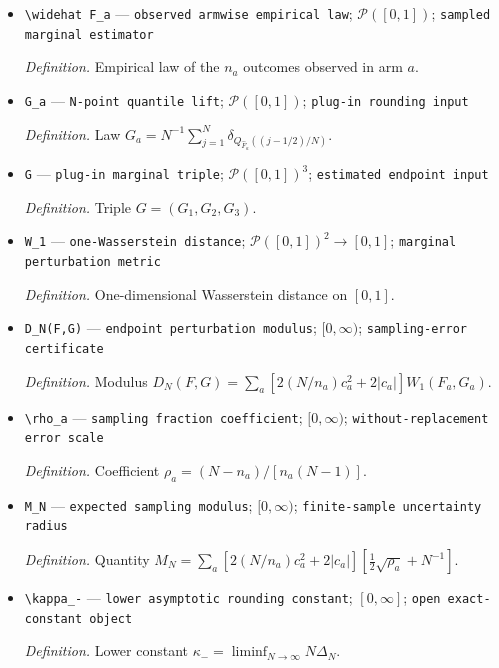 \documentclass{article}
\begin{document}
\begin{itemize}
  \item \texttt{\textbackslash{}\allowbreak{}widehat F\_\allowbreak{}a} --- \texttt{observed armwise empirical law}; \(\mathcal P([0,1])\); \texttt{sampled marginal estimator}
  \par\smallskip\noindent\emph{Definition.} Empirical law of the \(n_a\) outcomes observed in arm \(a\).
  \item \texttt{G\_\allowbreak{}a} --- \texttt{N-\allowbreak{}point quantile lift}; \(\mathcal P([0,1])\); \texttt{plug-\allowbreak{}in rounding input}
  \par\smallskip\noindent\emph{Definition.} Law \(G_a=N^{-1}\sum_{j=1}^N\delta_{Q_{\widehat F_a}((j-1/2)/N)}\).
  \item \texttt{G} --- \texttt{plug-\allowbreak{}in marginal triple}; \(\mathcal P([0,1])^3\); \texttt{estimated endpoint input}
  \par\smallskip\noindent\emph{Definition.} Triple \(G=(G_1,G_2,G_3)\).
  \item \texttt{W\_\allowbreak{}1} --- \texttt{one-\allowbreak{}Wasserstein distance}; \(\mathcal P([0,1])^2\to[0,1]\); \texttt{marginal perturbation metric}
  \par\smallskip\noindent\emph{Definition.} One-dimensional Wasserstein distance on \([0,1]\).
  \item \texttt{D\_\allowbreak{}N(F,\allowbreak{}G)} --- \texttt{endpoint perturbation modulus}; \([0,\infty)\); \texttt{sampling-\allowbreak{}error certificate}
  \par\smallskip\noindent\emph{Definition.} Modulus \(D_N(F,G)=\sum_a[2(N/n_a)c_a^2+2|c_a|]W_1(F_a,G_a)\).
  \item \texttt{\textbackslash{}\allowbreak{}rho\_\allowbreak{}a} --- \texttt{sampling fraction coefficient}; \([0,\infty)\); \texttt{without-\allowbreak{}replacement error scale}
  \par\smallskip\noindent\emph{Definition.} Coefficient \(\rho_a=(N-n_a)/[n_a(N-1)]\).
  \item \texttt{M\_\allowbreak{}N} --- \texttt{expected sampling modulus}; \([0,\infty)\); \texttt{finite-\allowbreak{}sample uncertainty radius}
  \par\smallskip\noindent\emph{Definition.} Quantity \(M_N=\sum_a[2(N/n_a)c_a^2+2|c_a|][\tfrac12\sqrt{\rho_a}+N^{-1}]\).
  \item \texttt{\textbackslash{}\allowbreak{}kappa\_\allowbreak{}-\allowbreak{}} --- \texttt{lower asymptotic rounding constant}; \([0,\infty]\); \texttt{open exact-\allowbreak{}constant object}
  \par\smallskip\noindent\emph{Definition.} Lower constant \(\kappa_-=\liminf_{N\to\infty}N\Delta_N\).

\end{itemize}
\end{document}
